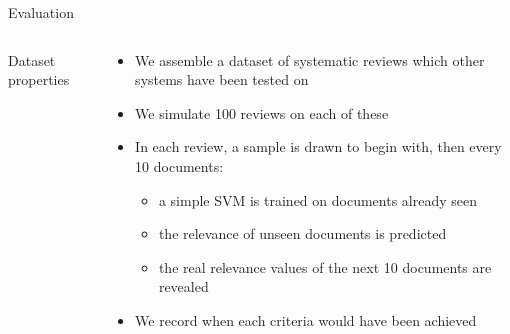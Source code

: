 \documentclass[9pt, aspectratio=169]{beamer}
\begin{document}
\begin{frame}{Evaluation}
\begin{columns}
	\begin{column}{0.618\linewidth}
		\begin{table}
			\footnotesize
			
			\caption{Dataset properties}
			\label{tab:data}
		\end{table}
	\end{column}
	\begin{column}{0.382\linewidth}
		
		\begin{itemize}
			\item We assemble a dataset of systematic reviews which other systems have been tested on
			\item We simulate 100 reviews on each of these
			\item In each review, a sample is drawn to begin with, then every 10 documents:
			\begin{itemize}
				\item a simple SVM is trained on documents already seen
				\item the relevance of unseen documents is predicted
				\item the real relevance values of the next 10 documents are revealed
			\end{itemize}
			\item We record when each criteria would have been achieved
		\end{itemize}
		
	\end{column}
\end{columns}

\end{frame}
\end{document}
